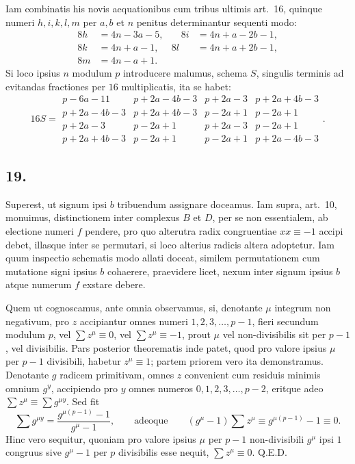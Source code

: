 \documentclass[12pt]{article}
\begin{document}
Iam combinatis his novis aequationibus cum tribus ultimis art.~16, quinque numeri $h,i,k,l,m$ per $a,b$ et $n$ penitus determinantur sequenti modo:
\[
\begin{aligned}
8h&=4n-3a-5,&\quad 8i&=4n+a-2b-1,\\
8k&=4n+a-1,& 8l&=4n+a+2b-1,\\
8m&=4n-a+1.
\end{aligned}
\]
Si loco ipsius $n$ modulum $p$ introducere malumus, schema $S$, singulis terminis ad evitandas fractiones per $16$ multiplicatis, ita se habet:
\[
16S=\begin{array}{rrrr}
p-6a-11&p+2a-4b-3&p+2a-3&p+2a+4b-3\\
p+2a-4b-3&p+2a+4b-3&p-2a+1&p-2a+1\\
p+2a-3&p-2a+1&p+2a-3&p-2a+1\\
p+2a+4b-3&p-2a+1&p-2a+1&p+2a-4b-3
\end{array}.
\]

\subsection*{19.}

Superest, ut signum ipsi $b$ tribuendum assignare doceamus. Iam supra, art.~10, monuimus, distinctionem inter complexus $B$ et $D$, per se non essentialem, ab electione numeri $f$ pendere, pro quo alterutra radix congruentiae $xx\equiv-1$ accipi debet, illasque inter se permutari, si loco alterius radicis altera adoptetur. Iam quum inspectio schematis modo allati doceat, similem permutationem cum mutatione signi ipsius $b$ cohaerere, praevidere licet, nexum inter signum ipsius $b$ atque numerum $f$ exstare debere.

Quem ut cognoscamus, ante omnia observamus, si, denotante $\mu$ integrum non negativum, pro $z$ accipiantur omnes numeri $1,2,3,\ldots,p-1$, fieri secundum modulum $p$, vel $\sum z^\mu\equiv0$, vel $\sum z^\mu\equiv-1$, prout $\mu$ vel non-divisibilis sit per $p-1$, vel divisibilis. Pars posterior theorematis inde patet, quod pro valore ipsius $\mu$ per $p-1$ divisibili, habetur $z^\mu\equiv1$; partem priorem vero ita demonstramus. Denotante $g$ radicem primitivam, omnes $z$ convenient cum residuis minimis omnium $g^y$, accipiendo pro $y$ omnes numeros $0,1,2,3,\ldots,p-2$, eritque adeo $\sum z^\mu\equiv\sum g^{\mu y}$. Sed fit
\[
\sum g^{\mu y}=\frac{g^{\mu(p-1)}-1}{g^\mu-1},
\qquad\text{adeoque}\qquad
(g^\mu-1)\sum z^\mu\equiv g^{\mu(p-1)}-1\equiv0.
\]
Hinc vero sequitur, quoniam pro valore ipsius $\mu$ per $p-1$ non-divisibili $g^\mu$ ipsi $1$ congruus sive $g^\mu-1$ per $p$ divisibilis esse nequit, $\sum z^\mu\equiv0$. Q.E.D.
\end{document}
